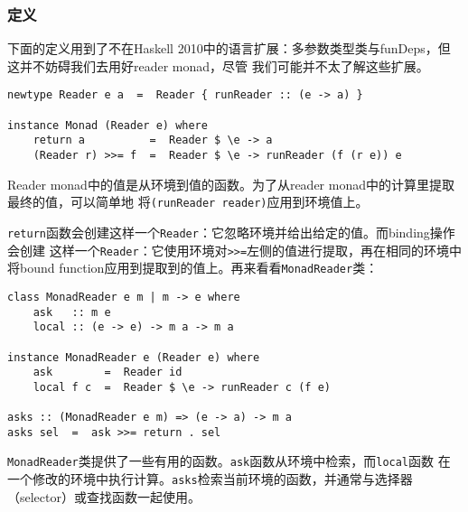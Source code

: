 \subsubsection{定义}
\indent{}下面的定义用到了不在Haskell 2010中的语言扩展：多参数类型类与funDeps，但这并不妨碍我们去用好reader monad，尽管
我们可能并不太了解这些扩展。
\begin{verbatim}
newtype Reader e a  =  Reader { runReader :: (e -> a) }

instance Monad (Reader e) where
    return a          =  Reader $ \e -> a
    (Reader r) >>= f  =  Reader $ \e -> runReader (f (r e)) e
\end{verbatim}
\noindent{}Reader monad中的值是从环境到值的函数。为了从reader monad中的计算里提取最终的值，可以简单地
将\texttt{(runReader reader)}应用到环境值上。

\indent{}\texttt{return}函数会创建这样一个\texttt{Reader}：它忽略环境并给出给定的值。而binding操作会创建
这样一个\texttt{Reader}：它使用环境对\texttt{>>=}左侧的值进行提取，再在相同的环境中
将bound function应用到提取到的值上。再来看看\texttt{MonadReader}类：
\begin{verbatim}
class MonadReader e m | m -> e where
    ask   :: m e
    local :: (e -> e) -> m a -> m a

instance MonadReader e (Reader e) where
    ask        =  Reader id
    local f c  =  Reader $ \e -> runReader c (f e)

asks :: (MonadReader e m) => (e -> a) -> m a
asks sel  =  ask >>= return . sel
\end{verbatim}
\noindent{}\texttt{MonadReader}类提供了一些有用的函数。\texttt{ask}函数从环境中检索，而\texttt{local}函数
在一个修改的环境中执行计算。\texttt{asks}检索当前环境的函数，并通常与选择器（selector）或查找函数一起使用。

